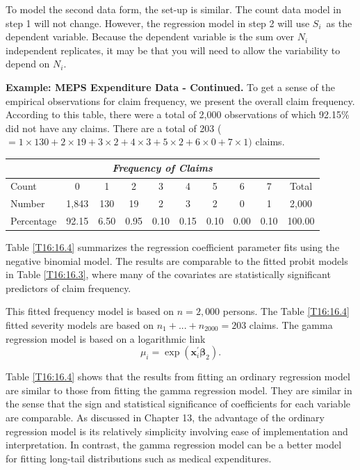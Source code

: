 \bigskip

To model the second data form, the set-up is similar. The count data model
in step 1 will not change. However, the regression model in step 2 will use $%
S_i$\ as the dependent variable. Because the dependent variable is
the sum over $N_i$ independent replicates, it may be that you will
need to allow the variability to depend on $N_i$.

\linejed

\textbf{Example: MEPS Expenditure Data - Continued.} To get a sense
of the empirical observations for claim frequency, we present the
overall claim frequency. According to this table, there were a total
of 2,000 observations of which 92.15\% did not have any claims.
There are a total of 203 ($=1\times 130+2\times 19+3\times 2+4\times
3+5\times 2+6\times 0+7\times 1)$ claims.


\bigskip
{}\begin{center}
\begin{tabular}{l|ccccccccc}
\multicolumn{10}{c}{\textit{\large{Frequency of Claims}}} \\
\hline Count & 0 & 1 & 2 & 3 & 4 & 5 & 6 & 7 & Total \\ \hline
Number & 1,843 & 130 & 19 & 2 & 3 & 2 & 0 & 1 & 2,000 \\
Percentage & 92.15 & 6.50 & 0.95 & 0.10 & 0.15 & 0.10 & 0.00 & 0.10
& 100.00 \\ \hline
\end{tabular}\end{center}
\bigskip


Table \ref{T16:16.4} summarizes the regression coefficient parameter
fits using the negative binomial model. The results are comparable
to the fitted probit models in Table \ref{T16:16.3}, where many of
the covariates are statistically significant predictors of claim
frequency.

This fitted frequency model is based on $n=2,000$ persons. The Table
\ref{T16:16.4} fitted severity models are based on
$n_{1}+...+n_{2000}=203$ claims. The gamma regression model is based
on a logarithmic link
\begin{equation*}
\mu_i=\exp \left(\mathbf{x}_i^{\prime}\boldsymbol \beta_2 \right).
\end{equation*}

Table \ref{T16:16.4} shows that the results from fitting an ordinary
regression model are similar to those from fitting the gamma
regression model. They are similar in the sense that the sign and
statistical significance of coefficients for each variable are
comparable. As discussed in Chapter 13, the advantage of the
ordinary regression model is its relatively simplicity involving
ease of implementation and interpretation. In contrast, the gamma
regression model can be a better model for fitting long-tail
distributions such as medical expenditures.

